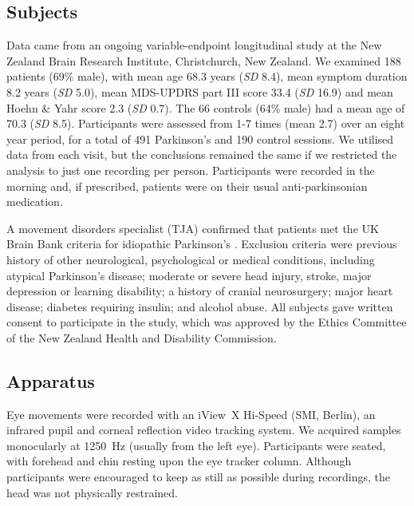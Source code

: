 \documentclass[jou,a4paper]{apa6}
\begin{document}
\subsection{Subjects}

Data came from an ongoing variable-endpoint longitudinal study at the New Zealand Brain Research Institute, Christchurch, New Zealand. We examined 188 patients (69\% male), with mean age 68.3 years (\textit{SD} 8.4), mean symptom duration 8.2 years (\textit{SD} 5.0), mean MDS-UPDRS part III score 33.4 (\textit{SD} 16.9) and mean Hoehn \& Yahr score 2.3 (\textit{SD} 0.7). The 66 controls (64\% male) had a mean age of 70.3 (\textit{SD} 8.5). Participants were assessed from 1-7 times (mean 2.7) over an eight year period, for a total of 491 Parkinson's and 190 control sessions. We utilised data from each visit, but the conclusions remained the same if we restricted the analysis to just one recording per person. Participants were recorded in the morning and, if prescribed, patients were on their usual anti-parkinsonian medication.

A movement disorders specialist (TJA) confirmed that patients met the UK Brain Bank criteria for idiopathic Parkinson's \citep{Hughes1992Accuracy-of-cli}. Exclusion criteria were previous history of other neurological, psychological or medical conditions, including atypical Parkinson's disease; moderate or severe head injury, stroke, major depression or learning disability; a history of cranial neurosurgery; major heart disease; diabetes requiring insulin; and alcohol abuse. All subjects gave written consent to participate in the study, which was approved by the Ethics Committee of the New Zealand Health and Disability Commission. 

\subsection{Apparatus}
Eye movements were recorded with an iView~X Hi-Speed (SMI, Berlin), an infrared pupil and corneal reflection video tracking system. We acquired samples monocularly at 1250~Hz (usually from the left eye). Participants were seated, with forehead and chin resting upon the eye tracker column. Although participants were encouraged to keep as still as possible during recordings, the head was not physically restrained.

\end{document}
